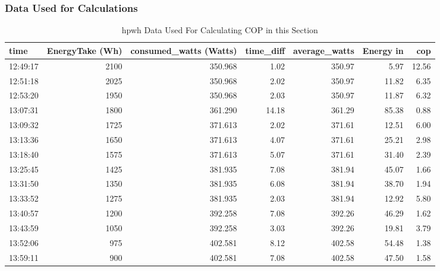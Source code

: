 \subsubsection{Data Used for Calculations}
\begin{table}[ht!]
\caption{\gls{hpwh} Data Used For Calculating COP in this Section}
\begin{adjustbox}{max width=\textwidth}
\begin{tabular}{|l|r|r|r|r|r|r|}
\hline
    time &  EnergyTake (Wh) &  consumed\_watts (Watts) &  time\_diff &  average\_watts &  Energy in &   cop \\ \hline

12:49:17 &               2100 &         350.968 &       1.02 &         350.97 &   5.97 & 12.56 \\ \hline
12:51:18 &               2025 &         350.968 &       2.02 &         350.97 &  11.82 &  6.35 \\ \hline
12:53:20 &               1950 &         350.968 &       2.03 &         350.97 &  11.87 &  6.32 \\ \hline
13:07:31 &               1800 &         361.290 &      14.18 &         361.29 &  85.38 &  0.88 \\ \hline
13:09:32 &               1725 &         371.613 &       2.02 &         371.61 &  12.51 &  6.00 \\ \hline
13:13:36 &               1650 &         371.613 &       4.07 &         371.61 &  25.21 &  2.98 \\ \hline
13:18:40 &               1575 &         371.613 &       5.07 &         371.61 &  31.40 &  2.39 \\ \hline
13:25:45 &               1425 &         381.935 &       7.08 &         381.94 &  45.07 &  1.66 \\ \hline
13:31:50 &               1350 &         381.935 &       6.08 &         381.94 &  38.70 &  1.94 \\ \hline
13:33:52 &               1275 &         381.935 &       2.03 &         381.94 &  12.92 &  5.80 \\ \hline
13:40:57 &               1200 &         392.258 &       7.08 &         392.26 &  46.29 &  1.62 \\ \hline
13:43:59 &               1050 &         392.258 &       3.03 &         392.26 &  19.81 &  3.79 \\ \hline
13:52:06 &                975 &         402.581 &       8.12 &         402.58 &  54.48 &  1.38 \\ \hline
13:59:11 &                900 &         402.581 &       7.08 &         402.58 &  47.50 &  1.58 \\ \hline

\end{tabular}
\end{adjustbox}
\end{table}
